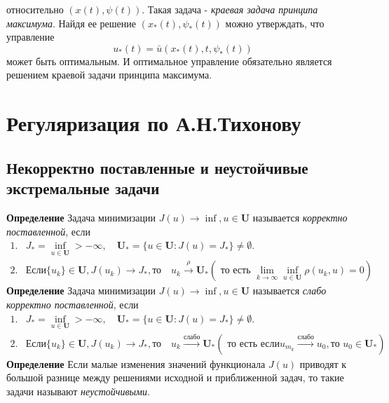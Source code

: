 \documentclass[A4]{article}
\begin{document}
относительно $(x(t),\psi(t))$. Такая задача - \emph{краевая задача принципа максимума}. Найдя ее решение $(x_*(t),\psi_*(t))$ можно утверждать, что управление
\begin{equation*}
u_*(t)=\bar{u}(x_*(t),t,\psi_{*}(t))
\end{equation*}
может быть оптимальным. И оптимальное управление обязательно является решением краевой задачи принципа максимума.
\section{Регуляризация по А.Н.Тихонову}
\subsection{Некорректно поставленные и неустойчивые экстремальные задачи}
\textbf{Определение} Задача минимизации $J(u)\rightarrow \inf,u\in\mathbf{U}$ называется \emph{корректно поставленной}, если 
\begin{equation*}
\begin{aligned}
1.&J_*=\inf_{u\in\mathbf{U}}>-\infty,\quad \mathbf{U}_*=\{u\in\mathbf{U}:J(u)=J_* \}\ne\emptyset.\\
2.&\text{Если} \{u_k\}\in\mathbf{U},J(u_k)\rightarrow J_*,\text{то}\quad u_k\stackrel{\rho}{\rightarrow}\mathbf{U}_*(\text{ то есть } \lim_{k\rightarrow\infty}\inf_{u\in\mathbf{U}}\rho(u_k,u)=0)
\end{aligned}
\end{equation*}
\textbf{Определение} Задача минимизации $J(u)\rightarrow \inf,u\in\mathbf{U}$ называется \emph{слабо корректно поставленной}, если 
\begin{equation*}
\begin{aligned}
1.&J_*=\inf_{u\in\mathbf{U}}>-\infty,\quad \mathbf{U}_*=\{u\in\mathbf{U}:J(u)=J_* \}\ne\emptyset.\\
2.&\text{Если} \{u_k\}\in\mathbf{U},J(u_k)\rightarrow J_*,\text{то}\quad u_k\stackrel{\text{слабо}}{\rightarrow}\mathbf{U}_*(\text{ то есть если} u_{m_k}\stackrel{\text{слабо}}{\rightarrow}u_0, \text{то }u_0\in\mathbf{U}_*)
\end{aligned}
\end{equation*}
\textbf{Определение} Если малые изменения значений функционала $J(u)$ приводят к большой разнице между решениями исходной и приближенной задач, то такие задачи называют \emph{неустойчивыми}.
\end{document}
